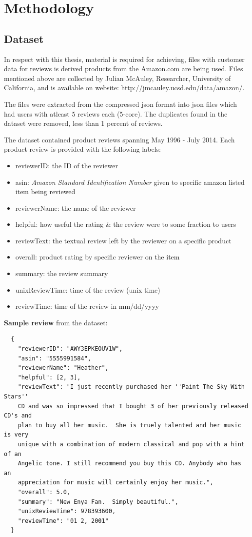 \chapter{Methodology}

\section{Dataset}
In respect with this thesis, material is required for achieving, files with customer data for reviews is derived products from the Amazon.com are being used. Files mentioned above are collected by Julian McAuley, Researcher, University of California, and is available on website: http://jmcauley.ucsd.edu/data/amazon/.

The files were extracted from the compressed json format into json files which had users with atleast 5 reviews each (5-core). The duplicates found in the dataset were removed, less than 1 percent of reviews.

The dataset contained product reviews spanning May 1996 - July 2014. Each product review is provided with the following labels:
\begin{itemize}
\item reviewerID: the ID of the reviewer
\item asin: \textit{Amazon Standard Identification Number} given to specific amazon listed item being reviewed
\item reviewerName: the name of the reviewer
\item helpful: how useful the rating \& the review were to some fraction to users
\item reviewText: the textual review left by the reviewer on a specific product
\item overall: product rating by specific reviewer on the item
\item summary: the review summary
\item unixReviewTime: time of the review (unix time)
\item reviewTime: time of the review in mm/dd/yyyy
\end{itemize}

\textbf{Sample review} from the dataset:
\begin{verbatim}
  {
    "reviewerID": "AWY3EPKEOUV1W", 
    "asin": "5555991584", 
    "reviewerName": "Heather", 
    "helpful": [2, 3], 
    "reviewText": "I just recently purchased her ''Paint The Sky With Stars''
    CD and was so impressed that I bought 3 of her previously released CD's and
    plan to buy all her music.  She is truely talented and her music is very
    unique with a combination of modern classical and pop with a hint of an
    Angelic tone. I still recommend you buy this CD. Anybody who has an
    appreciation for music will certainly enjoy her music.",
    "overall": 5.0, 
    "summary": "New Enya Fan.  Simply beautiful.", 
    "unixReviewTime": 978393600, 
    "reviewTime": "01 2, 2001"
  }
\end{verbatim}

